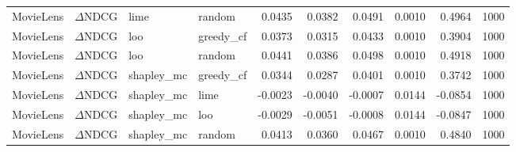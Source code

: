 \begin{longtable}{@{}p{.12\linewidth}p{.18\linewidth}p{.13\linewidth}p{.13\linewidth}rrrrrr@{}}
MovieLens & $\Delta$NDCG & lime & random & 0.0435 & 0.0382 & 0.0491 & 0.0010 & 0.4964 & 1000 \\
MovieLens & $\Delta$NDCG & loo & greedy\_cf & 0.0373 & 0.0315 & 0.0433 & 0.0010 & 0.3904 & 1000 \\
MovieLens & $\Delta$NDCG & loo & random & 0.0441 & 0.0386 & 0.0498 & 0.0010 & 0.4918 & 1000 \\
MovieLens & $\Delta$NDCG & shapley\_mc & greedy\_cf & 0.0344 & 0.0287 & 0.0401 & 0.0010 & 0.3742 & 1000 \\
MovieLens & $\Delta$NDCG & shapley\_mc & lime & -0.0023 & -0.0040 & -0.0007 & 0.0144 & -0.0854 & 1000 \\
MovieLens & $\Delta$NDCG & shapley\_mc & loo & -0.0029 & -0.0051 & -0.0008 & 0.0144 & -0.0847 & 1000 \\
MovieLens & $\Delta$NDCG & shapley\_mc & random & 0.0413 & 0.0360 & 0.0467 & 0.0010 & 0.4840 & 1000 \\
\end{longtable}
